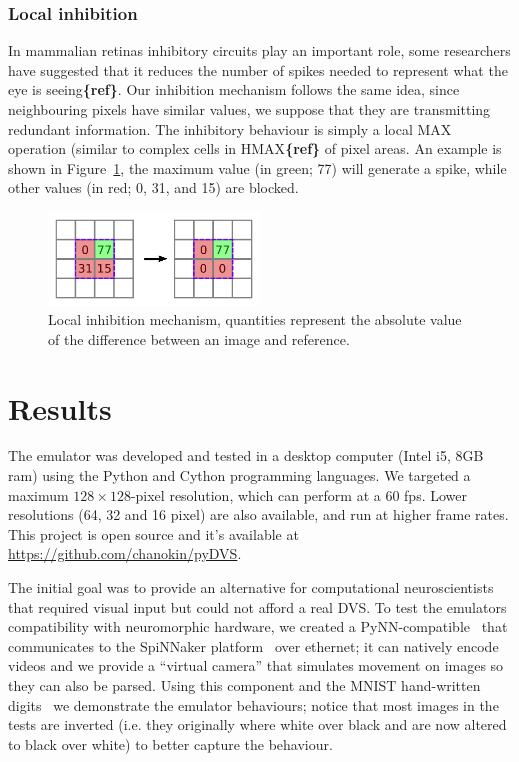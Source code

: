 \documentclass[twocolumn]{article}
\begin{document}
\subsubsection{Local inhibition} 
In mammalian retinas inhibitory circuits play an important role, some researchers have suggested that it reduces the number of spikes needed to represent what the eye is seeing\textbf{\{ref\}}. Our inhibition mechanism follows the same idea, since neighbouring pixels have similar values, we suppose that they are transmitting redundant information. The inhibitory behaviour is simply a local MAX operation (similar to complex cells in HMAX\textbf{\{ref\}} of pixel areas. An example is shown in Figure~\ref{fig:local_inh}, the maximum value (in green; 77) will generate a spike, while other values (in red; 0, 31, and 15) are blocked.

\begin{figure}[htb]

  \includegraphics[width=0.5\textwidth]{inh_local_max}
  \caption{Local inhibition mechanism, quantities represent the absolute value of the difference between an image and reference.}
  \label{fig:local_inh}
\end{figure}


\section{Results}

The emulator was developed and tested in a desktop computer (Intel i5, 8GB ram) using the Python and Cython programming languages. We targeted a maximum $128\times 128$-pixel resolution, which can perform at a 60 fps. Lower resolutions (64, 32 and 16 pixel) are also available, and run at higher frame rates. This project is open source and it's available at \url{https://github.com/chanokin/pyDVS}.

The initial goal was to provide an alternative for computational neuroscientists that required visual input but could not afford a real DVS. To test the emulators compatibility with neuromorphic hardware, we created a PyNN-compatible~\cite{pynn} that communicates to the SpiNNaker platform~\cite{spinnaker_overview} over ethernet; it can natively encode videos and we provide a ``virtual camera'' that simulates movement on images so they can also be parsed. Using this component and the MNIST hand-written digits~\cite{mnist} we demonstrate the emulator behaviours; notice that most images in the tests are inverted (i.e. they originally where white over black and are now altered to black over white) to better capture the behaviour.
\end{document}
